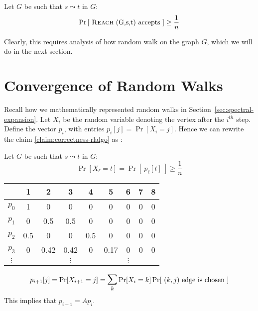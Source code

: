 \begin{claim}
\label{claim:correctness-rlalgo} 
Let $G$ be such that $s \leadsto t$ in $G$:
$$\Pr \left[~\textrm{{\sc Reach}~(G,s,t) accepts}~
\right] \ge \frac{1}{n}$$
\end{claim}

\noindent Clearly, this requires analysis of how random walk on the graph $G$, which we will do in the next section.

\section{Convergence of Random Walks}

Recall how we mathematically represented random walks in Section~\ref{sec:spectral-expansion}. Let $X_i$ be the random variable denoting the vertex after the $i^{th}$ step. Define the vector $p_i$, with entries $p_i[j] = \Pr[X_{i} = j]$. Hence we can rewrite the claim \ref{claim:correctness-rlalgo} as :
\begin{claim}
\label{claim:rwalk-bound}
Let $G$ be such that $s \leadsto t$ in $G$:
$$\Pr \left[X_\ell = t\right] = \Pr \left[~p_\ell[t]~
\right] \ge \frac{1}{n}$$
\end{claim}

\hspace{-6mm}\begin{minipage}{0.75\linewidth}
\begin{center}
\begin{tabular}{c|cccccccc}
& 1 & 2 & 3 & 4 & 5 & 6 & 7 & 8 \\
\hline
$p_0$ & 1   & 0    & 0    & 0   & 0 & 0 & 0 & 0 \\
$p_1$ & 0   & 0.5  & 0.5  & 0   & 0 & 0 & 0 & 0 \\
$p_2$ & 0.5 & 0    & 0    & 0.5 & 0 & 0 & 0 & 0 \\
$p_3$ & 0   & 0.42 & 0.42 & 0   & 0.17 & 0 & 0 & 0 \\
$\vdots$ &   &  & $\vdots$ &    & & $\vdots$ & & \\
\end{tabular}
\end{center}
$$p_{i+1}[j] = \Pr[X_{i+1} = j] = \bigsum_k \Pr[X_{i} = k]\Pr[\textrm{ $(k,j)$ edge is chosen }] $$
This implies that $p_{i+1} = Ap_i$. 
\end{minipage}
\begin{minipage}{0.05\linewidth}
~
\end{minipage}
\begin{minipage}{0.15\linewidth}
\GraphInit[vstyle=Classic]
\SetUpVertex[FillColor=blue!60]  
\end{minipage}


